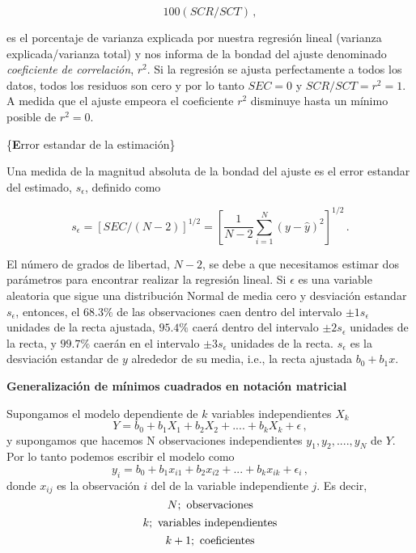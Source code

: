 \documentclass[
]{agujournal2019}
\begin{document}
\[100(SCR/SCT)\,,\]

es el porcentaje de varianza explicada por nuestra regresión lineal
(varianza explicada/varianza total) y nos informa de la bondad del
ajuste denominado \emph{coeficiente de correlación}, \(r^2\). Si la
regresión se ajusta perfectamente a todos los datos, todos los residuos
son cero y por lo tanto \(SEC=0\) y \(SCR/SCT=r^2=1\). A medida que el
ajuste empeora el coeficiente \(r^2\) disminuye hasta un mínimo posible
de \(r^2=0\).

\vspace{0.5cm}

\{\noindent \textbf Error estandar de la estimación\}

\noindent Una medida de la magnitud absoluta de la bondad del ajuste es
el error estandar del estimado, \(s_{\epsilon}\), definido como

\[s_{\epsilon}=[SEC/(N-2)]^{1/2}=\left[ \frac{1}{N-2}\sum\limits^N_{i=1} (y-\hat{y})^2\right]^{1/2}\,.\]

El número de grados de libertad, \(N-2\), se debe a que necesitamos
estimar dos parámetros para encontrar realizar la regresión lineal. Si
\({\epsilon}\) es una variable aleatoria que sigue una distribución
Normal de media cero y desviación estandar \(s_{\epsilon}\), entonces,
el \(68.3\%\) de las observaciones caen dentro del intervalo
\(\pm 1s_{\epsilon}\) unidades de la recta ajustada, \(95.4\%\) caerá
dentro del intervalo \(\pm 2 s_{\epsilon}\) unidades de la recta, y
\(99.7\%\) caerán en el intervalo \(\pm 3 s_{\epsilon}\) unidades de la
recta. \(s_{\epsilon}\) es la desviación estandar de \(y\) alrededor de
su media, i.e., la recta ajustada \(b_0 + b_1 x\).

\vspace{0.5cm}

\textbf{Generalización de mínimos cuadrados en notación matricial}

\noindent Supongamos el modelo dependiente de \(k\) variables
independientes \(X_k\)
\[Y=b_0 + b_1 X_1 + b_2 X_2 + .... + b_k X_k + \epsilon\,,\] y
supongamos que hacemos N observaciones independientes
\(y_1, y_2,....,y_N\) de \(Y\). Por lo tanto podemos escribir el modelo
como
\[y_i=b_0 + b_1 x_{i1} + b_2 x_{i2} + ... + b_k x_{ik} + \epsilon_i\,,\]
donde \(x_{ij}\) es la observación \(i\) del de la variable
independiente \(j\). Es decir, \[N;\,\,{\rm observaciones}\]
\[k;\,\,{\rm variables\,\,independientes}\]
\[k+1;\,\,{\rm coeficientes}\]
\end{document}
